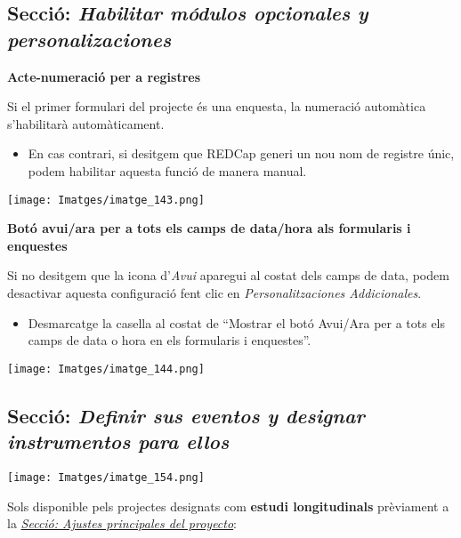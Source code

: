 \documentclass[
]{article}
\providecommand{\tightlist}{%
  \setlength{\itemsep}{0pt}\setlength{\parskip}{0pt}}
\begin{document}
\hypertarget{secciuxf3-habilitar-muxf3dulos-opcionales-y-personalizaciones-1}{%
\subsection{\texorpdfstring{\textbf{Secció}: \emph{Habilitar módulos opcionales y personalizaciones}}{Secció: Habilitar módulos opcionales y personalizaciones}}\label{secciuxf3-habilitar-muxf3dulos-opcionales-y-personalizaciones-1}}

\textbf{Acte-numeració per a registres}

Si el primer formulari del projecte és una enquesta, la numeració automàtica s'habilitarà automàticament.

\begin{itemize}
\tightlist
\item
  En cas contrari, si desitgem que REDCap generi un nou nom de registre únic, podem habilitar aquesta funció de manera manual.
\end{itemize}

\texttt{[image: Imatges/imatge\_143.png]}

\textbf{Botó avui/ara per a tots els camps de data/hora als formularis i enquestes}

Si no desitgem que la icona d'\emph{Avui} aparegui al costat dels camps de data, podem desactivar aquesta configuració fent clic en \emph{Personalitzaciones Addicionales}.

\begin{itemize}
\tightlist
\item
  Desmarcatge la casella al costat de ``Mostrar el botó Avui/Ara per a tots els camps de data o hora en els formularis i enquestes''.
\end{itemize}

\texttt{[image: Imatges/imatge\_144.png]}

\hypertarget{en1}{%
\subsection{\texorpdfstring{\textbf{Secció}: \emph{Definir sus eventos y designar instrumentos para ellos}}{Secció: Definir sus eventos y designar instrumentos para ellos}}\label{en1}}

\texttt{[image: Imatges/imatge\_154.png]}

Sols disponible pels projectes designats com \textbf{estudi longitudinals} prèviament a la \protect\hyperlink{en7}{\emph{Secció: Ajustes principales del proyecto}}:
\end{document}
